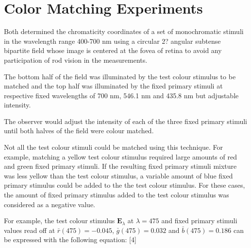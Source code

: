 \section{Color Matching Experiments}%
\label{sec:color-matching-experiments}


Both determined the chromaticity coordinates of a set of monochromatic stimuli in the wavelength range 400-700 nm using a circular 2? angular subtense bipartite field whose image is centered at the fovea of retina to avoid any participation of rod vision in the measurements.

The bottom half of the field was illuminated by the test colour stimulus to be matched and the top half was illuminated by the fixed primary stimuli at respective fixed wavelengths of 700 nm, 546.1 nm and 435.8 nm but adjustable intensity.

The observer would adjust the intensity of each of the three fixed primary stimuli until both halves of the field were colour matched.

Not all the test colour stimuli could be matched using this technique. For example, matching a yellow test colour stimulus required large amounts of red and green fixed primary stimuli. If the resulting fixed primary stimuli mixture was less yellow than the test colour stimulus, a variable amount of blue fixed primary stimulus could be added to the the test colour stimulus. For these cases, the amount of fixed primary stimulus added to the test colour stimulus was considered as a negative value.

For example, the test colour stimulus $\textbf{E}_\lambda$ at $\lambda=475$ and fixed primary stimuli values read off at $\bar{r}(475)=-0.045$, $\bar{g}(475)=0.032$ and $\bar{b}(475)=0.186$ can be expressed with the following equation: [4]


